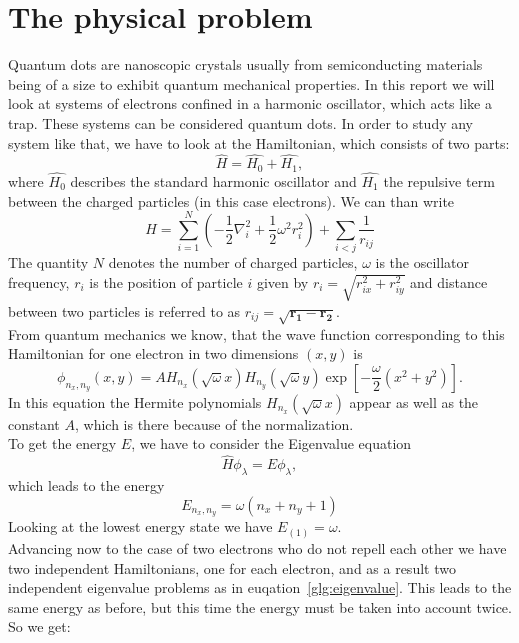 \section{The physical problem}\label{sec:problem}
Quantum dots are nanoscopic crystals usually from semiconducting materials being of a size to exhibit quantum mechanical properties. In this report we will look at systems of electrons confined in a harmonic oscillator, which acts like a trap. These systems can be considered quantum dots. In order to study any system like that, we have to look at the Hamiltonian, which consists of two parts:
\begin{equation}
\hat{H} = \hat{H_0} + \hat{H_1},
\end{equation}
where $\hat{H_0}$ describes the standard harmonic oscillator and $\hat{H_1}$ the repulsive term between the charged particles (in this case electrons). We can than write
\begin{equation}
\hat{H} = \sum_{i=1}^N \left( -\frac{1}{2} \nabla_i^2 + \frac{1}{2} \omega^2 r_i^2 \right) + \sum_{i<j} \frac{1}{r_{ij}}
\end{equation}
The quantity $N$ denotes the number of charged particles, $\omega$ is the oscillator frequency, $r_i$ is the position of particle $i$ given by $r_i = \sqrt{r_{ix}^2 + r_{iy}^2}$ and distance between two particles is referred to as $r_{ij} = \sqrt{\mathbf{r_1}- \mathbf{r_2}}$.\\
From quantum mechanics we know, that the wave function corresponding to this Hamiltonian for one electron in two dimensions $(x,y)$ is
\begin{equation}\label{glg:wavefunc1}
\phi_{n_x,n_y}(x,y) = A H_{n_x} (\sqrt{\omega} x) H_{n_y} (\sqrt{\omega} y) \exp\left[-\frac{\omega}{2} (x^2+y^2)\right].
\end{equation}
In this equation the Hermite polynomials $H_{n_x} (\sqrt{\omega} x)$ appear as well as the constant $A$, which is there because of the normalization.\\
To get the energy $E$, we have to consider the Eigenvalue equation
\begin{equation}\label{glg:eigenvalue}
\hat{H} \phi_\lambda = E \phi_\lambda,
\end{equation}
which leads to the energy
\begin{equation}
E_{n_x,n_y} = \omega(n_x + n_y +1)
\end{equation}
Looking at the lowest energy state we have $E_{(1)}=\omega$.\\
Advancing now to the case of two electrons who do not repell each other we have two independent Hamiltonians, one for each electron, and as a result two independent eigenvalue problems as in euqation~\ref{glg:eigenvalue}. This leads to the same energy as before, but this time the energy must be taken into account twice. So we get:
